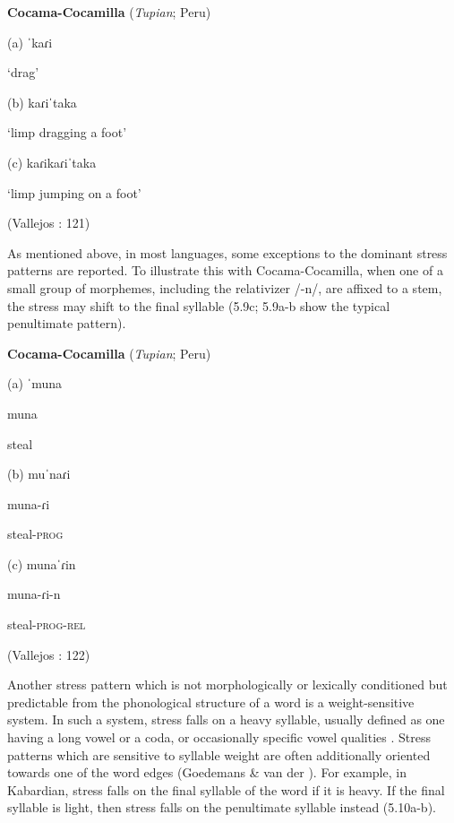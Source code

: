\ea\label{ex:(5.8)}
  \textbf{Cocama-Cocamilla} (\textit{Tupian}; Peru)



(a)   ˈkaɾi



‘drag’



(b)   kaɾiˈtaka



‘limp dragging a foot’



(c)   kaɾikaɾiˈtaka



‘limp jumping on a foot’



(Vallejos \citealt{Yopán2010}: 121)

\z


  As mentioned above, in most languages, some exceptions to the dominant stress patterns are reported. To illustrate this with Cocama-Cocamilla, when one of a small group of morphemes, including the relativizer /{}-n/, are affixed to a stem, the stress may shift to the final syllable (5.9c; 5.9a-b show the typical penultimate pattern).



\ea\label{ex:(5.9)}
  \textbf{Cocama-Cocamilla} (\textit{Tupian}; Peru)


(a)   ˈmuna


  muna



steal



(b)   muˈnaɾi



  muna-ɾi



steal-\textsc{prog}



(c)  munaˈɾin



  muna-ɾi-n



steal-\textsc{prog}{}-\textsc{rel}



(Vallejos \citealt{Yopán2010}: 122)

\z


  Another stress pattern which is not morphologically or lexically conditioned but predictable from the phonological structure of a word is a weight-sensitive system. In such a system, stress falls on a heavy syllable, usually defined as one having a long vowel or a coda, or occasionally specific vowel qualities \citep{Gordon2006}. Stress patterns which are sensitive to syllable weight are often additionally oriented towards one of the word edges (Goedemans \& van der \citealt{Hulst2013b}). For example, in Kabardian, stress falls on the final syllable of the word if it is heavy. If the final syllable is light, then stress falls on the penultimate syllable instead (5.10a-b).



